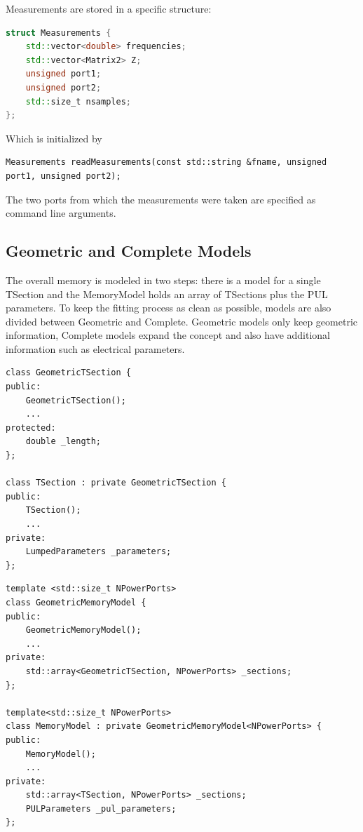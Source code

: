 Measurements are stored in a specific structure:
\begin{lstlisting}[language=C++]
struct Measurements {
    std::vector<double> frequencies;
    std::vector<Matrix2> Z;
    unsigned port1;
    unsigned port2;
    std::size_t nsamples;
};
\end{lstlisting}
Which is initialized by
\begin{lstlisting}
Measurements readMeasurements(const std::string &fname, unsigned port1, unsigned port2);
\end{lstlisting}
The two ports from which the measurements were taken are specified as command line arguments.

\subsection{Geometric and Complete Models}
The overall memory is modeled in two steps: there is a model for a single TSection and the MemoryModel holds an array of TSections plus the PUL parameters. To keep the fitting process as clean as possible, models are also divided between Geometric and Complete. Geometric models only keep geometric information, Complete models expand the concept and also have additional information such as electrical parameters.

\begin{lstlisting}[title=Snippets for Geometric and Complete TSection]
class GeometricTSection {
public:
    GeometricTSection();
    ...
protected:
    double _length;
};

class TSection : private GeometricTSection {
public:
    TSection();
    ...
private:
    LumpedParameters _parameters;
};
\end{lstlisting}

\begin{lstlisting}[title=Snippets for Geometric and Complete MemoryModel]
template <std::size_t NPowerPorts>
class GeometricMemoryModel {
public:
    GeometricMemoryModel();
    ...
private:
    std::array<GeometricTSection, NPowerPorts> _sections;
};

template<std::size_t NPowerPorts>
class MemoryModel : private GeometricMemoryModel<NPowerPorts> {
public:
    MemoryModel();
    ...
private:
    std::array<TSection, NPowerPorts> _sections;
    PULParameters _pul_parameters;
};
\end{lstlisting}

